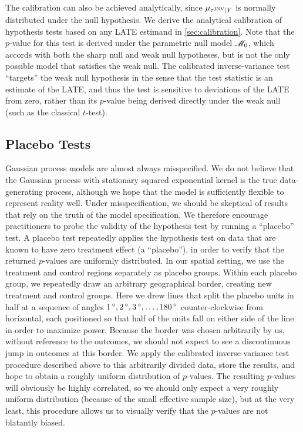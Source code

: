 The calibration can also be achieved analytically, since \(\mu_{\tau^{\mathrm{INV}} \mid Y}\) is normally distributed under the null hypothesis.
We derive the analytical calibration of hypothesis tests based on any LATE estimand in \autoref{sec:calibration}.
Note that the \(p\)-value for this test is derived under the parametric null model \(\mathscr{M}_0\), which accords with both the sharp null and weak null hypotheses, but is not the only possible model that satisfies the weak null.
The calibrated inverse-variance test “targets” the weak null hypothesis in the sense that the test statistic is an estimate of the LATE, and thus the test is sensitive to deviations of the LATE from zero, rather than its \(p\)-value being derived directly under the weak null (such as the classical \(t\)-test).

\label{eq:calib_test}

\subsection{Placebo Tests}
\label{sec:placebo}
Gaussian process models are almost always misspecified.
We do not believe that the Gaussian process with stationary squared exponential kernel is the true data-generating process, although we hope that the model is sufficiently flexible to represent reality well.
Under misspecification, we should be skeptical of results that rely on the truth of the model specification.
We therefore encourage practitioners to probe the validity of the hypothesis test by running a ``placebo'' test.
A placebo test repeatedly applies the hypothesis test on data that are known to have zero treatment effect (a ``placebo''),
in order to verify that the returned \(p\)-values are uniformly distributed.
In our spatial setting, we use the treatment and control regions separately as placebo groups.
Within each placebo group, we repeatedly draw an arbitrary geographical border, creating new treatment and control groups.
Here we drew lines that split the placebo units in half at a sequence of angles \(1{\,^\circ},2{\,^\circ},3{\,^\circ},\dotsc,180{\,^\circ}\) counter-clockwise from horizontal, each positioned so that half of the units fall on either side of the line in order to maximize power.
Because the border was chosen arbitrarily by us, without reference to the outcomes, we should not expect to see a discontinuous jump in outcomes at this border.
We apply the calibrated inverse-variance test procedure described above to this arbitrarily divided data, store the results, and hope to obtain a roughly uniform distribution of \(p\)-values.
The resulting \(p\)-values will obviously be highly correlated, so we should only expect a very roughly uniform distribution (because of the small effective sample size), but at the very least, this procedure allows us to visually verify that the \(p\)-values are not blatantly biased.

